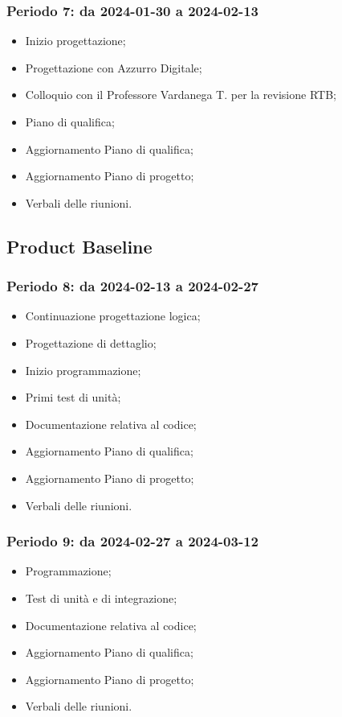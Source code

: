 \documentclass[10pt, a4paper]{article}
\begin{document}
{{{{{{{{\subsubsection{Periodo 7: da 2024-01-30 a 2024-02-13}
%
\begin{itemize}
    \item Inizio progettazione;
    \item Progettazione con Azzurro Digitale;
    \item Colloquio con il Professore Vardanega T. per la revisione RTB;
    \item Piano di qualifica;
    \item Aggiornamento Piano di qualifica;
    \item Aggiornamento Piano di progetto;
    \item Verbali delle riunioni.
\end{itemize}

\subsection{Product Baseline}

\subsubsection{Periodo 8: da 2024-02-13 a 2024-02-27}
%
\begin{itemize}
    \item Continuazione progettazione logica;
    \item Progettazione di dettaglio;
    \item Inizio programmazione;
    \item Primi test di unità;
    \item Documentazione relativa al codice;
    \item Aggiornamento Piano di qualifica;
    \item Aggiornamento Piano di progetto;
    \item Verbali delle riunioni.
\end{itemize}

\subsubsection{Periodo 9: da 2024-02-27 a 2024-03-12}
%
\begin{itemize}
    \item Programmazione;
    \item Test di unità e di integrazione;
    \item Documentazione relativa al codice;
    \item Aggiornamento Piano di qualifica;
    \item Aggiornamento Piano di progetto;
    \item Verbali delle riunioni.
\end{itemize}

}}}}}}}}
\end{document}
